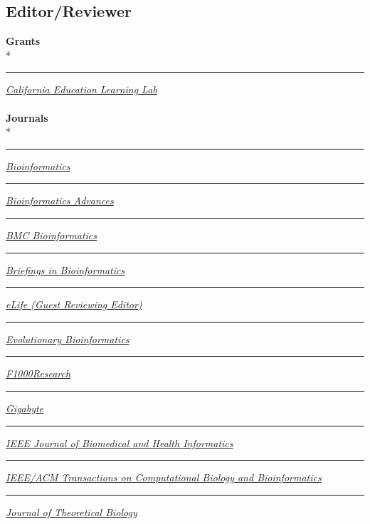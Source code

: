 \documentclass[margin,line]{res}
\begin{document}
\begin{resume}
\section{\sc Editor/Reviewer}
\textbf{Grants}\\*
\rule{-1mm}{5mm} \hspace*{4mm} \href{http://opr.ca.gov/learninglab/}{\textit{California Education Learning Lab}}\\
~\\
\textbf{Journals}\\*
\rule{-1mm}{5mm} \hspace*{4mm} \href{https://academic.oup.com/bioinformatics}{\textit{Bioinformatics}}\\
\rule{-1mm}{5mm} \hspace*{4mm} \href{https://academic.oup.com/bioinformaticsadvances}{\textit{Bioinformatics Advances}}\\
\rule{-1mm}{5mm} \hspace*{4mm} \href{https://bmcbioinformatics.biomedcentral.com/}{\textit{BMC Bioinformatics}}\\
\rule{-1mm}{5mm} \hspace*{4mm} \href{https://academic.oup.com/bib}{\textit{Briefings in Bioinformatics}}\\
\rule{-1mm}{5mm} \hspace*{4mm} \href{https://elifesciences.org/}{\textit{eLife (Guest Reviewing Editor)}}\\
\rule{-1mm}{5mm} \hspace*{4mm} \href{https://journals.sagepub.com/home/evb}{\textit{Evolutionary Bioinformatics}}\\
\rule{-1mm}{5mm} \hspace*{4mm} \href{https://f1000research.com}{\textit{F1000Research}}\\
\rule{-1mm}{5mm} \hspace*{4mm} \href{https://gigabytejournal.com/}{\textit{Gigabyte}}\\
\rule{-1mm}{6mm} \hspace*{4mm} \href{https://ieeexplore.ieee.org/xpl/aboutJournal.jsp?punumber=6221020}{\textit{IEEE Journal of Biomedical and Health Informatics}}\\
\rule{-1mm}{6mm} \hspace*{4mm} \href{https://ieeexplore.ieee.org/xpl/aboutJournal.jsp?punumber=8857}{\textit{IEEE/ACM Transactions on Computational Biology and Bioinformatics}}\\
\rule{-1mm}{5mm} \hspace*{4mm} \href{https://www.sciencedirect.com/journal/journal-of-theoretical-biology}{\textit{Journal of Theoretical Biology}}\\

\end{resume}
\end{document}
